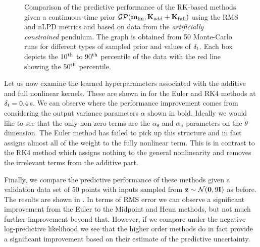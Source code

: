 \begin{figure}
{
}
\caption{Comparison of the predictive performance of the RK-based methods given a continuous-time prior $\mathcal{GP}(\mathbf{m}_{\text{lin}},\mathbf{K}_{\text{add}} + \mathbf{K}_{\text{full}})$ using the RMS and nLPD metrics and based on data from the \textit{artificially constrained} pendulum. The graph is obtained from 50 Monte-Carlo runs for different types of sampled prior and values of $\delta_t$. Each box depicts the 10$^{\text{th}}$ to 90$^{\text{th}}$ percentile of the data with the red line showing the 50$^{\text{th}}$ percentile.}
\label{fig:pend2_validate}
\end{figure}





Let us now examine the learned hyperparameters associated with the additive and full nonlinear kernels. These are shown in  for the Euler and RK4 methods at $\delta_t = 0.4\,$s. We can observe where the performance improvement comes from considering the output variance parameters $\alpha$ shown in bold. Ideally we would like to see that the only non-zero terms are the $\alpha_\theta$ and $\alpha_u$ parameters on the $\dot\theta$ dimension. The Euler method has failed to pick up this structure and in fact assigns almost all of the weight to the fully nonlinear term. This is in contrast to the RK4 method which assigns nothing to the general nonlinearity and removes the irrelevant terms from the additive part.


Finally, we compare the predictive performance of these methods given a validation data set of 50 points with inputs sampled from $\mathbf{z} \sim \mathcal{N}(\mathbf{0},9\mathbf{I})$ as before. The results are shown in . In terms of RMS error we can observe a significant improvement from the Euler to the Midpoint and Heun methods, but not much further improvement beyond that. However, if we compare under the negative log-predictive likelihood we see that the higher order methods do in fact provide a significant improvement based on their estimate of the predictive uncertainty.







